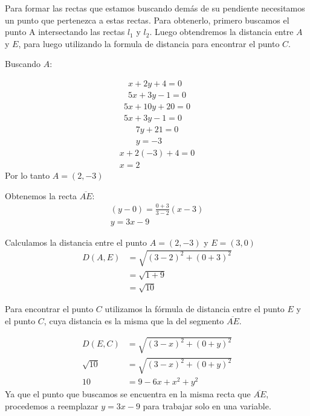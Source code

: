 \documentclass[a4paper,10pt]{article}
\begin{document}
\begin{enumerate}
\begin{minipage}{.4\textwidth}
\end{minipage}

Para formar las rectas que estamos buscando demás de su pendiente necesitamos un punto que pertenezca a estas rectas. Para obtenerlo, primero buscamos el punto A intersectando las rectas $l_1$ y $l_2$. Luego obtendremos la distancia entre $A$
 y $E$, para luego utilizando la formula de distancia para encontrar el punto $C$.\\
 \vspace{5mm}
 
 Buscando $A$:
 
\begin{gather*}
x+2y+4 =  0\\
5x+3y-1 =  0
\end{gather*}
\begin{gather*}
5x+10y+20=  0 \\ 
5x+3y-1 =  0
\end{gather*}
\begin{gather*}
7y+21=  0 \\
y=-3
\end{gather*}
\begin{gather*}
x+2(-3)+4 =  0\\
x=2
\end{gather*}
Por lo tanto $A=(2,-3)$

 \vspace{5mm}
 
 
 Obtenemos la recta $\overline{AE}$:
 \begin{gather*}
(y-0)=\frac{0+3}{3-2}(x-3)\\
y=3x-9
\end{gather*}
 
 
  \vspace{5mm}
 
 Calculamos la distancia entre el punto $A=(2,-3)$ y $E=(3,0)$
\begin{align*}
D(A,E) &= \sqrt{(3-2)^2+(0+3)^2}\\
&= \sqrt{1+9} \\
&= \sqrt{10}
\end{align*}

Para encontrar el punto $C$ utilizamos la fórmula de distancia entre el punto $E$ y el punto $C$, cuya distancia es la misma que la del segmento $\overline{AE}$.

\begin{align*}
D(E,C) &= \sqrt{(3-x)^2+(0+y)^2}\\
\sqrt{10} &= \sqrt{(3-x)^2+(0+y)^2}\\
10 &= 9 - 6x + x^2 + y^2
\end{align*}
Ya que el punto que buscamos se encuentra en la misma recta que $\overline{AE}$, procedemos a reemplazar $y=3x-9$ para trabajar solo en una variable.


\end{enumerate}
\end{document}
